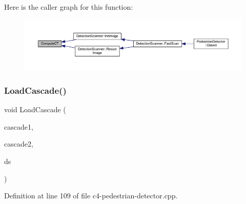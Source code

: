 Here is the caller graph for this function\+:\nopagebreak
\begin{figure}[H]
\begin{center}
\leavevmode
\includegraphics[width=350pt]{c4-pedestrian-detector_8cpp_a205804b2ee8558313222a898513a9543_icgraph}
\end{center}
\end{figure}
\mbox{\label{c4-pedestrian-detector_8cpp_a1c2c730891bb9a5800d3761e8cfaa160}} 
\subsubsection{\texorpdfstring{Load\+Cascade()}{LoadCascade()}}
{\footnotesize\ttfamily void Load\+Cascade (\begin{DoxyParamCaption}\item[{std\+::string}]{cascade1,  }\item[{std\+::string}]{cascade2,  }\item[{\mbox{\hyperlink{class_detection_scanner}{Detection\+Scanner}} \&}]{ds }\end{DoxyParamCaption})}



Definition at line 109 of file c4-\/pedestrian-\/detector.\+cpp.


